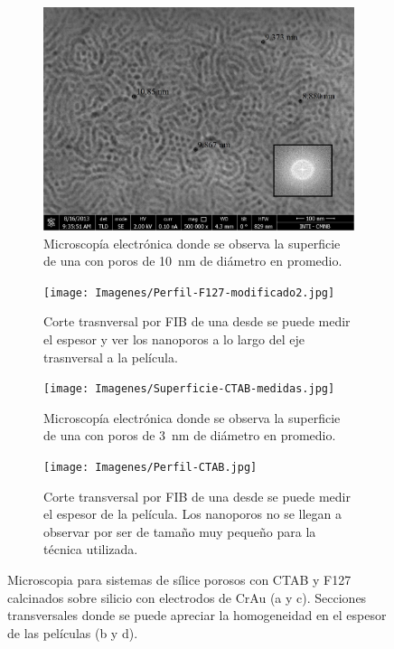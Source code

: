 			\begin{figure}[th]
		 	   	    \begin{subfigure}[t]{0.49\textwidth}
			        	\includegraphics[width=\textwidth]{Imagenes/Superficie-F127-medidas.jpg}
			       		\caption{Microscopía electrónica donde se observa la superficie de una \pdmF\space con poros de \SI{10}{nm} de diámetro en promedio.}
			       		\label{fig:sem_homogeneidad1}
			       		\end{subfigure}
					\begin{subfigure}[t]{0.49\textwidth}
			 	   	    \texttt{[image: Imagenes/Perfil-F127-modificado2.jpg]}
			       		\caption{Corte trasnversal por FIB de una \pdmF\space desde se puede medir el espesor y ver los nanoporos a lo largo del eje trasnversal a la película.}
			       		\label{fig:sem_homogeneidad2}
			       		\end{subfigure}
			       	\begin{subfigure}[t]{0.49\textwidth}
			        	\texttt{[image: Imagenes/Superficie-CTAB-medidas.jpg]}
			       		\caption{Microscopía electrónica donde se observa la superficie de una \pdmF\space con poros de \SI{3}{nm} de diámetro en promedio.}
			       		\label{fig:sem_homogeneidad3}
			       		\end{subfigure}
					\begin{subfigure}[t]{0.49\textwidth}
			 	   	    \texttt{[image: Imagenes/Perfil-CTAB.jpg]}
			       		\caption{Corte transversal por FIB de una \pdmC\space desde se puede medir el espesor de la película. Los nanoporos no se llegan a observar por ser de tamaño muy pequeño para la técnica utilizada.}
			       		\label{fig:sem_homogeneidad4}
			       		\end{subfigure}	
					 \caption[MEB \pdmC\space y \pdmF.]{Microscopia para sistemas de sílice porosos con CTAB y F127 calcinados sobre silicio con electrodos de Cr\textbar Au (a y c). Secciones transversales donde se puede apreciar la homogeneidad en el espesor de las películas (b y d).}
					 \label{fig:sem_homogeneidad}	
				     \end{figure}

